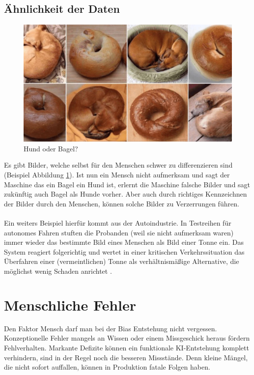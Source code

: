 \documentclass[12pt,oneside,a4paper,parskip]{scrbook}
\begin{document}
\subsection{Ähnlichkeit der Daten}
\label{section:similarData}
\begin{figure}[h]
	\begin{center}
		\includegraphics[width=15cm]{Bilder/dog_or_bagel.jpg}
		\caption{Hund oder Bagel?}
		\label{fig:dogBagel}
	\end{center}
\end{figure}

Es gibt Bilder, welche selbst für den Menschen schwer zu differenzieren sind (Beispiel Abbildung \ref{fig:dogBagel}). Ist nun ein Mensch nicht aufmerksam und sagt der Maschine das ein Bagel ein Hund ist, erlernt die Maschine falsche Bilder und sagt zukünftig auch Bagel als Hunde vorher. Aber auch durch richtiges Kennzeichnen der Bilder durch den Menschen, können solche Bilder zu Verzerrungen führen.
\\\\
Ein weiters Beispiel hierfür kommt aus der Autoindustrie. In Testreihen für autonomes Fahren stuften die Probanden (weil sie nicht aufmerksam waren) immer wieder das bestimmte Bild eines Menschen als Bild einer Tonne ein. Das System reagiert folgerichtig und wertet in einer kritischen Verkehrssituation das Überfahren einer (vermeintlichen) Tonne als verhältnismäßige Alternative, die möglichst wenig Schaden anrichtet \cite{trainingsDataKI}.

\section{Menschliche Fehler}
Den Faktor Mensch darf man bei der Bias Entstehung nicht vergessen. Konzeptionelle Fehler mangels an Wissen oder einem Missgeschick heraus fördern Fehlverhalten. Markante Defizite können ein funktionale KI-Entstehung komplett verhindern, sind in der Regel noch die besseren Missstände. Denn kleine Mängel, die nicht sofort auffallen, können in Produktion fatale Folgen haben.
\end{document}
